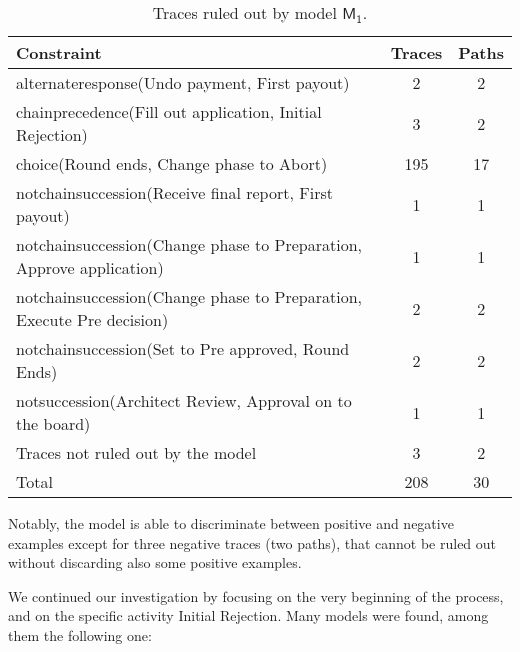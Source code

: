 
\begin{table}
\label{table:resultsModelM1}
\begin{center}
\begin{scriptsize}
\begin{tabular}{lcc}
Constraint & Traces & Paths \\
\hline
alternateresponse(Undo payment, First payout) & 2 & 2\\
chainprecedence(Fill out application, Initial Rejection) & 3 & 2\\
choice(Round ends, Change phase to Abort) & 195 & 17 \\
notchainsuccession(Receive final report, First payout) & 1 & 1 \\
notchainsuccession(Change phase to Preparation, Approve application) & 1 & 1\\
notchainsuccession(Change phase to Preparation, Execute Pre decision) & 2 & 2 \\
notchainsuccession(Set to Pre approved, Round Ends) & 2 & 2\\
notsuccession(Architect Review, Approval on to the board) & 1 & 1\\
\hline
Traces not ruled out by the model & 3 & 2 \\
\hline
Total & 208 & 30\\
\hline
\end{tabular}
\end{scriptsize}
\end{center}
\caption{Traces ruled out by model $\mathsf{M_1}$.}
\end{table}
%
Notably, the model is able to discriminate between positive and negative examples except for three negative traces (two paths), that cannot be ruled out without discarding also some positive examples.

We continued our investigation by focusing on the very beginning of the process, and on the specific activity \textsf{Initial Rejection}. Many models were found, among them the following one:

